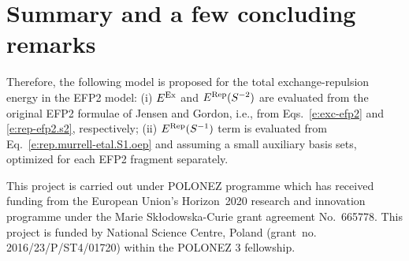 \section{\label{s:6.conclusions}Summary and a few concluding remarks}

Therefore, the following model is proposed for the
total exchange\hyp{}repulsion energy in the EFP2 model: 
(i) $E^{\rm Ex}$ and $E^{\rm Rep}(S^{-2})$ are evaluated
from the original EFP2 formulae of Jensen and Gordon, i.e.,
from Eqs.~\eqref{e:exc-efp2} and \eqref{e:rep-efp2.s2}, respectively;
(ii) $E^{\rm Rep}(S^{-1})$ term is evaluated from Eq.~\eqref{e:rep.murrell-etal.S1.oep}
and assuming a small auxiliary basis sets, optimized for each
EFP2 fragment separately.




\begin{acknowledgments}
This project is carried out under POLONEZ programme which has received funding from the European Union's
Horizon~2020 research and innovation programme under the Marie Sk{\l}odowska-Curie grant agreement 
No.~665778. This project is funded by National Science Centre, Poland 
(grant~no. 2016/23/P/ST4/01720) within the POLONEZ 3 fellowship.
\end{acknowledgments}






